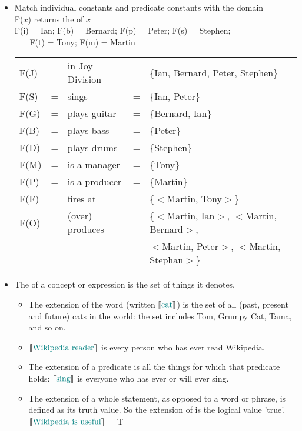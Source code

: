 \documentclass[headrule,footrule]{foils}
\newcommand{\den}[2][]{\ensuremath{\llbracket\textnormal{\textcolor{teal}{#2}}\rrbracket^{\ensuremath{#1}}}}
\begin{document}
\begin{itemize}
\item Match individual constants and predicate constants with the domain
\\ F($x$) returns the  of $x$
    \\ F(i) = Ian; F(b) = Bernard; F(p) = Peter; F(s) = Stephen; 
     \\ ~~~ F(t) = Tony;  F(m) = Martin
 \\ \begin{tabular}{lllll}
      F(J) & = & in Joy Division & = & \{Ian, Bernard, Peter, Stephen\} \\
      F(S) & = & sings & = & \{Ian, Peter\} \\      
      F(G) & = & plays guitar & = & \{Bernard, Ian\} \\
      F(B) & = & plays bass & = & \{Peter\} \\
      F(D) & = & plays drums & = & \{Stephen\} \\
      F(M) & = & is a manager & = & \{Tony\} \\
      F(P) & = & is a producer & = & \{Martin\} \\
      F(F) & = & fires at & = & \{$<$Martin, Tony$>$\} \\
      F(O) & = & (over) produces & = & \{$<$Martin, Ian$>$, $<$Martin, Bernard$>$, \\
      &&&&  $<$Martin, Peter$>$, $<$Martin, Stephan$>$\} \\
    \end{tabular}
\end{itemize}


\begin{itemize}
\item The  of a concept or expression is the set of things it denotes.
  \begin{itemize}
  \item The extension of the word  (written \den{cat}) is the
    set of all (past, present and future) cats in the world: the set
    includes Tom, Grumpy Cat, Tama,  and so on.
  \item \den{Wikipedia reader} is every person who has ever read Wikipedia.
  \item The extension of a predicate is all the things for which that predicate holds:
    \den{sing} is everyone who has ever or will ever sing.
  \item The extension of a whole statement, as opposed to a word or
    phrase, is defined as its truth value. So the extension of
     is the logical value 'true'.
    \\ \den{Wikipedia is useful} = T
  \end{itemize}
\end{itemize}
\end{document}
